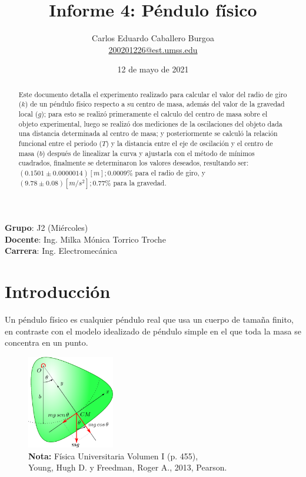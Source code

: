\documentclass[letter,11pt]{article}
\title{Informe 4: Péndulo físico}
\author{Carlos Eduardo Caballero Burgoa \\
    \small{\href{mailto:200201226@est.umss.edu}{200201226@est.umss.edu}}
}
\date{12 de mayo de 2021}
\newcommand{\source}[1]{\vspace{-11pt} \caption*{\small{\textbf{Nota:} {#1}}}}
\begin{document}
\maketitle
\begin{center}
    \textbf{Grupo}: J2 (Miércoles)\\
    \textbf{Docente}: Ing. Milka Mónica Torrico Troche\\
    \textbf{Carrera}: Ing. Electromecánica
\end{center}

\begin{abstract}
Este documento detalla el experimento realizado para calcular el valor del radio
de giro ($k$) de un péndulo físico respecto a su centro de masa, además del
valor de la gravedad local ($g$); para esto se realizó primeramente el calculo
del centro de masa sobre el objeto experimental, luego se realizó dos mediciones
de la oscilaciones del objeto dada una distancia determinada al centro de masa;
y posteriormente se calculó la relación funcional entre el periodo ($T$) y la
distancia entre el eje de oscilación y el centro de masa ($b$) después de
linealizar la curva y ajustarla con el método de mínimos cuadrados, finalmente
se determinaron los valores deseados, resultando ser:
$(0.1501 \pm 0.0000014) [m]; 0.0009\%$ para el radio de giro, y
$(9.78 \pm 0.08) [m/s^2]; 0.77\%$ para la gravedad.
\end{abstract}

\section{Introducción}

Un péndulo físico es cualquier péndulo real que usa un cuerpo de tamaña finito,
en contraste con el modelo idealizado de péndulo simple en el que toda la masa
se concentra en un punto.

\begin{figure}
\centering
\includegraphics[width=0.34\textwidth]{resources/f1.eps}
\caption{Dinámica de un péndulo físico.}
\label{figura1}
\source{Física Universitaria Volumen I (p. 455), \\
Young, Hugh D. y Freedman, Roger A., 2013, Pearson.}
\end{figure}
\end{document}
